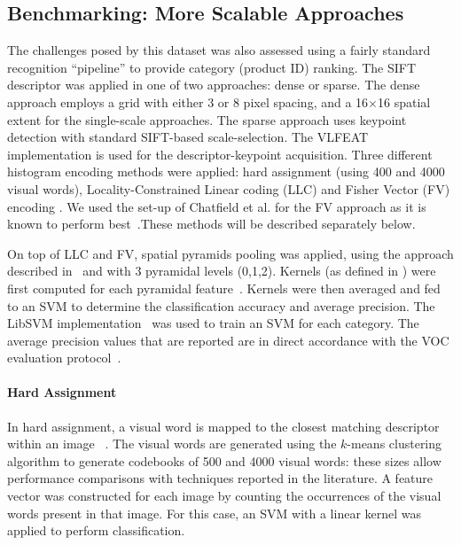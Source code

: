 


\subsection{Benchmarking: More Scalable Approaches}
\label{sec:bof}

The challenges posed by this dataset was also assessed using a fairly standard recognition ``pipeline'' to provide category (product ID) ranking. The SIFT descriptor was applied in one of two approaches: dense or sparse. The dense approach employs a grid with either 3 or 8 pixel spacing, and a 16$\times$16 spatial extent for the single-scale approaches. The sparse approach uses keypoint detection with standard SIFT-based scale-selection. The VLFEAT implementation is used for the descriptor-keypoint acquisition. Three different histogram encoding methods were applied: hard assignment \cite{Csurka2004} (using 400 and 4000 visual words), Locality-Constrained Linear coding (LLC) \cite{Wang2010} and Fisher Vector (FV) encoding \cite{Perronnin2010}. We used the set-up of Chatfield et al. for the FV approach as it is known to perform best~\cite{Chatfield2011}.These methods will be described separately below. 

On top of LLC and FV, spatial pyramids pooling was applied, using the approach described in~\cite{Lazebnik2006} and with 3 pyramidal levels (0,1,2). Kernels (as defined in \cite{Vedaldi2010}) were first computed for each pyramidal feature~\cite{VanDeSande2010}. Kernels were then averaged and fed to an SVM to determine the classification accuracy and average precision. The LibSVM implementation~\cite{CC01a} was used to train an SVM for each category. The average precision values that are reported are in direct accordance with the VOC evaluation protocol~\cite{Everingham2009}. 

\paragraph{Hard Assignment} 
In hard assignment, a visual word is mapped to the closest matching descriptor within an image ~\cite{Csurka2004}. The visual words are generated using the $k$-means clustering algorithm to generate codebooks of 500 and 4000 visual words: these sizes allow performance comparisons with techniques reported in the literature. A feature vector was constructed for each image by counting the occurrences of the visual words present in that image. For this case, an SVM with a linear kernel was applied to perform classification. 

